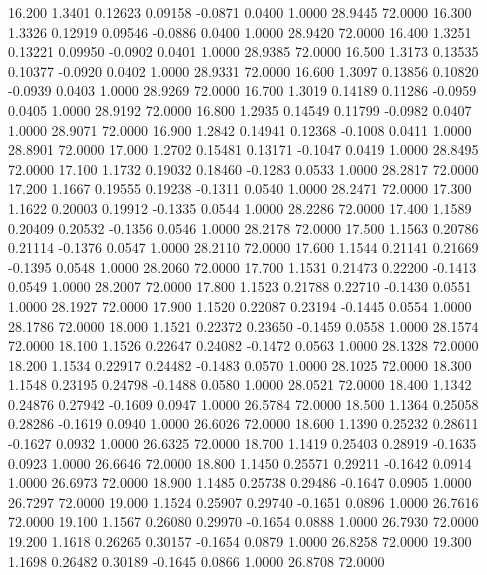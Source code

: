   16.200   1.3401   0.12623   0.09158  -0.0871   0.0400   1.0000  28.9445  72.0000
  16.300   1.3326   0.12919   0.09546  -0.0886   0.0400   1.0000  28.9420  72.0000
  16.400   1.3251   0.13221   0.09950  -0.0902   0.0401   1.0000  28.9385  72.0000
  16.500   1.3173   0.13535   0.10377  -0.0920   0.0402   1.0000  28.9331  72.0000
  16.600   1.3097   0.13856   0.10820  -0.0939   0.0403   1.0000  28.9269  72.0000
  16.700   1.3019   0.14189   0.11286  -0.0959   0.0405   1.0000  28.9192  72.0000
  16.800   1.2935   0.14549   0.11799  -0.0982   0.0407   1.0000  28.9071  72.0000
  16.900   1.2842   0.14941   0.12368  -0.1008   0.0411   1.0000  28.8901  72.0000
  17.000   1.2702   0.15481   0.13171  -0.1047   0.0419   1.0000  28.8495  72.0000
  17.100   1.1732   0.19032   0.18460  -0.1283   0.0533   1.0000  28.2817  72.0000
  17.200   1.1667   0.19555   0.19238  -0.1311   0.0540   1.0000  28.2471  72.0000
  17.300   1.1622   0.20003   0.19912  -0.1335   0.0544   1.0000  28.2286  72.0000
  17.400   1.1589   0.20409   0.20532  -0.1356   0.0546   1.0000  28.2178  72.0000
  17.500   1.1563   0.20786   0.21114  -0.1376   0.0547   1.0000  28.2110  72.0000
  17.600   1.1544   0.21141   0.21669  -0.1395   0.0548   1.0000  28.2060  72.0000
  17.700   1.1531   0.21473   0.22200  -0.1413   0.0549   1.0000  28.2007  72.0000
  17.800   1.1523   0.21788   0.22710  -0.1430   0.0551   1.0000  28.1927  72.0000
  17.900   1.1520   0.22087   0.23194  -0.1445   0.0554   1.0000  28.1786  72.0000
  18.000   1.1521   0.22372   0.23650  -0.1459   0.0558   1.0000  28.1574  72.0000
  18.100   1.1526   0.22647   0.24082  -0.1472   0.0563   1.0000  28.1328  72.0000
  18.200   1.1534   0.22917   0.24482  -0.1483   0.0570   1.0000  28.1025  72.0000
  18.300   1.1548   0.23195   0.24798  -0.1488   0.0580   1.0000  28.0521  72.0000
  18.400   1.1342   0.24876   0.27942  -0.1609   0.0947   1.0000  26.5784  72.0000
  18.500   1.1364   0.25058   0.28286  -0.1619   0.0940   1.0000  26.6026  72.0000
  18.600   1.1390   0.25232   0.28611  -0.1627   0.0932   1.0000  26.6325  72.0000
  18.700   1.1419   0.25403   0.28919  -0.1635   0.0923   1.0000  26.6646  72.0000
  18.800   1.1450   0.25571   0.29211  -0.1642   0.0914   1.0000  26.6973  72.0000
  18.900   1.1485   0.25738   0.29486  -0.1647   0.0905   1.0000  26.7297  72.0000
  19.000   1.1524   0.25907   0.29740  -0.1651   0.0896   1.0000  26.7616  72.0000
  19.100   1.1567   0.26080   0.29970  -0.1654   0.0888   1.0000  26.7930  72.0000
  19.200   1.1618   0.26265   0.30157  -0.1654   0.0879   1.0000  26.8258  72.0000
  19.300   1.1698   0.26482   0.30189  -0.1645   0.0866   1.0000  26.8708  72.0000
